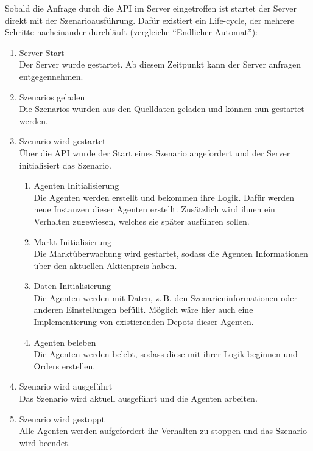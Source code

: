 Sobald die Anfrage durch die \ac{API} im Server eingetroffen ist startet der Server direkt mit der Szenarioausführung. Dafür existiert ein Life-cycle, der mehrere Schritte nacheinander durchläuft (vergleiche \enquote{Endlicher Automat}):

\begin{enumerate}
    \item Server Start\\
        Der Server wurde gestartet. Ab diesem Zeitpunkt kann der Server anfragen entgegennehmen.
    \item Szenarios geladen\\
        Die Szenarios wurden aus den Quelldaten geladen und können nun gestartet werden.
    \item Szenario wird gestartet\\
        Über die \ac{API} wurde der Start eines Szenario angefordert und der Server initialisiert das Szenario.
        \begin{enumerate}
            \item Agenten Initialisierung\\
                Die Agenten werden erstellt und bekommen ihre Logik. Dafür werden neue Instanzen dieser Agenten erstellt. Zusätzlich wird ihnen ein Verhalten zugewiesen, welches sie später ausführen sollen.
            \item Markt Initialisierung\\
                Die Marktüberwachung wird gestartet, sodass die Agenten Informationen über den aktuellen Aktienpreis haben.
            \item Daten Initialisierung\\
                Die Agenten werden mit Daten, z.\,B. den Szenarieninformationen oder anderen Einstellungen befüllt.
                Möglich wäre hier auch eine Implementierung von existierenden Depots dieser Agenten.
            \item Agenten beleben\\
                Die Agenten werden belebt, sodass diese mit ihrer Logik beginnen und Orders erstellen.
        \end{enumerate}
    \item Szenario wird ausgeführt\\
        Das Szenario wird aktuell ausgeführt und die Agenten arbeiten.
    \item Szenario wird gestoppt\\
        Alle Agenten werden aufgefordert ihr Verhalten zu stoppen und das Szenario wird beendet.
\end{enumerate}


